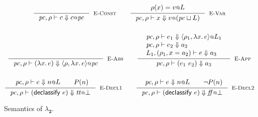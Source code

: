 \documentclass{article}
\makeatletter
\newcommand{\at}{\ensuremath{{\scriptstyle{@}}}}
\newcommand{\pc}{\ensuremath{{\mathit{pc}}}}
\theoremstyle{definition}
\makeatother
\begin{document}
\begin{figure}[ht]
  \centering
  \begin{gather*}
    \inference{}{
      \pc, \rho |- c \Downarrow c \at \pc
    }[\textsc{E-Const}]
    \qquad
    \inference{
      {\begin{array}{l}
          \rho(x) = v \at L
        \end{array}}
    }{
      \pc, \rho |- x \Downarrow v \at (\pc \sqcup L)
    }[\textsc{E-Var}]
    \\[3ex]
    \inference{}{
      \pc, \rho |- (\lambda{x}.\, e) \Downarrow
      \langle{\rho, \lambda{x}.\, e\rangle} \at \pc
    }[\textsc{E-Abs}]
    \qquad
    \inference{
      {\begin{array}{l}
          \pc, \rho |- e_1 \Downarrow
          \langle{\rho_1, \lambda{x}.\, e\rangle} \at L_1
          \\
          \pc, \rho |- e_2 \Downarrow a_2
          \\
          L_1, (\rho_1, x = a_2) |- e \Downarrow a_3
        \end{array}}
    }{
      \pc, \rho |- (e_1\ e_2) \Downarrow a_3
    }[\textsc{E-App}]
    \\[3ex]
    \inference{
      {\begin{array}{l}
          \pc, \rho |- e \Downarrow n \at L
        \end{array}}
      &
      P(n)
    }{
      \pc, \rho |- (\mathsf{declassify}\ e) \Downarrow
      \mathit{tt} \at \bot
    }[\textsc{E-Decl1}]
    \qquad
    \inference{
      {\begin{array}{l}
          \pc, \rho |- e \Downarrow n \at L
        \end{array}}
      &
      \lnot P(n)
    }{
      \pc, \rho |- (\mathsf{declassify}\ e) \Downarrow
      \mathit{ff} \at \bot
    }[\textsc{E-Decl2}]
  \end{gather*}
  \caption{Semantics of $\lambda_{\mathbf{2}}$.}
  \label{fig:semantics}
\end{figure}

\pagebreak
\end{document}
